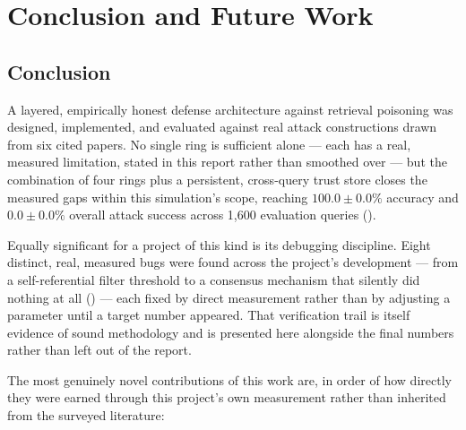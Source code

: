 \section{Conclusion and Future Work}
\label{sec:conclusion}

\subsection{Conclusion}

A layered, empirically honest defense architecture against retrieval
poisoning was designed, implemented, and evaluated against real attack
constructions drawn from six cited papers. No single ring is sufficient
alone --- each has a real, measured limitation, stated in this report
rather than smoothed over --- but the combination of four rings plus a
persistent, cross-query trust store closes the measured gaps within this
simulation's scope, reaching $100.0\pm0.0\%$ accuracy and $0.0\pm0.0\%$
overall attack success across 1{,}600 evaluation queries
().

Equally significant for a project of this kind is its debugging
discipline. Eight distinct, real, measured bugs were found across the
project's development --- from a self-referential filter threshold to a
consensus mechanism that silently did nothing at all
() --- each fixed by direct measurement rather than
by adjusting a parameter until a target number appeared. That
verification trail is itself evidence of sound methodology and is
presented here alongside the final numbers rather than left out of the
report.

The most genuinely novel contributions of this work are, in order of how
directly they were earned through this project's own measurement rather
than inherited from the surveyed literature:

